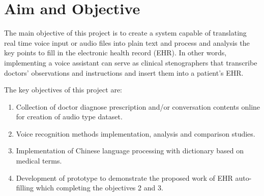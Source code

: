 \documentclass[12pt, a4paper, twoside]{extarticle}
\begin{document}
\section{Aim and Objective}
The main objective of this project is to create a system capable of translating real time voice input or audio files into plain text and process and analysis the key points to fill in the electronic health record (EHR). In other words, implementing a voice assistant can serve as clinical stenographers that transcribe doctors’ observations and instructions and insert them into a patient’s EHR.

The key objectives of this project are: 

\begin{enumerate}
	\item Collection of doctor diagnose prescription and/or conversation contents online for creation of audio type dataset.
	\item Voice recognition methods implementation, analysis and comparison studies.
	\item Implementation of Chinese language processing with dictionary based on medical terms.
	\item Development of prototype to demonstrate the proposed work of EHR auto-filling which completing the objectives 2 and 3.

\end{enumerate}

\newtheorem{exmp}{Stage}
\end{document}
